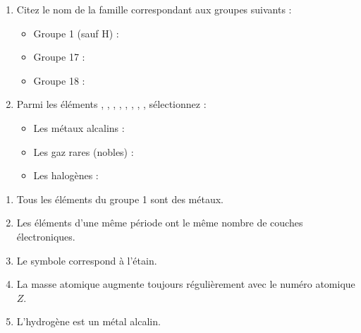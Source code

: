 \documentclass[11pt]{article}
\begin{document}
\begin{exercice}
\begin{enumerate}
    \item Citez le nom de la famille correspondant aux groupes suivants :
    \begin{itemize}
        \item Groupe 1 (sauf H) : \underline{\hspace{5cm}}
        \item Groupe 17 : \underline{\hspace{5cm}}
        \item Groupe 18 : \underline{\hspace{5cm}}
    \end{itemize}
    \item Parmi les éléments , , , , , , , , sélectionnez :
    \begin{itemize}
        \item Les métaux alcalins : \underline{\hspace{5cm}}
        \item Les gaz rares (nobles) : \underline{\hspace{5cm}}
        \item Les halogènes : \underline{\hspace{5cm}}
    \end{itemize}
\end{enumerate}
\end{exercice}

\begin{exercice}
\begin{enumerate}
    \item Tous les éléments du groupe 1 sont des métaux.
    \item Les éléments d'une même période ont le même nombre de couches électroniques.
    \item Le symbole  correspond à l'étain.
    \item La masse atomique augmente toujours régulièrement avec le numéro atomique $Z$.
    \item L'hydrogène est un métal alcalin.
\end{enumerate}
\end{exercice}
\end{document}

